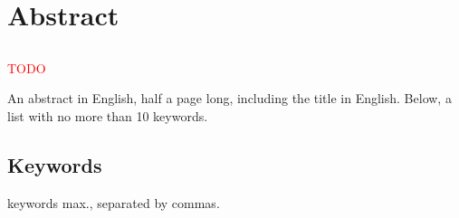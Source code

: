 \chapter*{Abstract}

\section*{\tituloPortadaEngVal}

\textcolor{red}{TODO}

An abstract in English, half a page long, including the title in English. Below, a list with no more than 10 keywords.

\section*{Keywords}

 keywords max., separated by commas.
